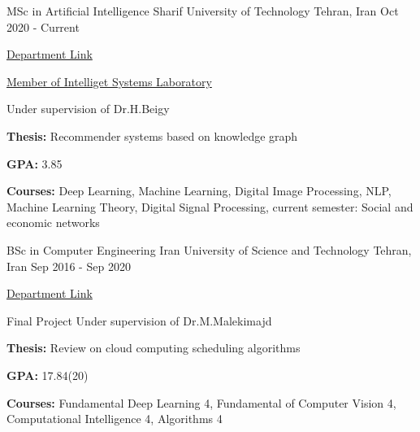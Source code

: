 




\begin{cventries}

    \cventry
    {MSc in Artificial Intelligence} %
    {Sharif University of Technology} %
    {Tehran, Iran} %
    {Oct 2020 - Current} %
    {
      \begin{cvitems} %
        {\href{https://ce.sharif.edu/}{Department Link}}
        \item {\href{http://isl.ce.sharif.edu/}{Member of Intelliget Systems Laboratory}}
        \item Under supervision of Dr.H.Beigy
        \item {\textbf{Thesis:} Recommender systems based on knowledge graph}
        \item {\textbf{GPA:} 
        3.85}
        \item {\textbf{Courses:} 
        Deep Learning, 
        Machine Learning, 
        Digital Image Processing, 
        NLP,  
        Machine Learning Theory, 
        Digital Signal Processing,
        current semester: Social and economic networks}
      \end{cvitems}
    }
    
    
    \cventry
    {BSc in Computer Engineering} %
    {Iran University of Science and Technology} %
    {Tehran, Iran} %
    {Sep 2016 - Sep 2020} %
    {
      \begin{cvitems} %
        \href{http://ce-inter.iust.ac.ir/}{Department Link}
        \item Final Project Under supervision of Dr.M.Malekimajd
        \item {\textbf{Thesis:} Review on cloud computing scheduling algorithms}
        \item {\textbf{GPA:} 
        17.84(20)}
        \item {\textbf{Courses:} 
        Fundamental Deep Learning 4, 
        Fundamental of Computer Vision 4, 
        Computational Intelligence 4, 
        Algorithms 4}
      \end{cvitems}
    }
    

\end{cventries}
